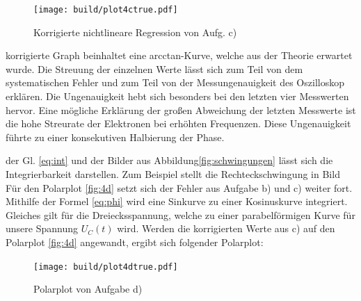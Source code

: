  \begin{figure}[H]
    \texttt{[image: build/plot4ctrue.pdf]}
    \centering
    \caption{Korrigierte nichtlineare Regression von Aufg. c)}
    \label{fig:4ctrue}
  \end{figure}

 \justifying korrigierte Graph beinhaltet eine arcctan-Kurve, welche aus der Theorie 
erwartet wurde. Die Streuung der einzelnen Werte lässt sich zum Teil von dem 
systematischen Fehler und zum Teil von der Messungenauigkeit des Oszilloskop erklären.
Die Ungenauigkeit hebt sich besonders bei den letzten vier Messwerten hervor. 
Eine mögliche Erklärung der großen Abweichung der letzten Messwerte ist die hohe 
Streurate der Elektronen bei erhöhten Frequenzen. Diese Ungenauigkeit führte zu einer 
konsekutiven Halbierung der Phase.


 \justifying der Gl. \eqref{eq:int} und der Bilder aus Abbildung\ref{fig:schwingungen} 
lässt sich die Integrierbarkeit darstellen. Zum Beispiel stellt die Rechteckschwingung in Bild \\
Für den Polarplot \ref{fig:4d} setzt sich der Fehler aus Aufgabe b) und c) weiter fort.
Mithilfe der Formel \eqref{eq:phi} wird eine Sinkurve zu einer Kosinuskurve integriert.
Gleiches gilt für die Dreiecksspannung, welche zu einer parabelförmigen
Kurve für unsere Spannung $U_C(t)$ wird.
Werden die korrigierten Werte aus c) auf den Polarplot \ref{fig:4d} angewandt, ergibt sich 
folgender Polarplot:

  \begin{figure}[H]
    \texttt{[image: build/plot4dtrue.pdf]}
    \centering
    \caption{Polarplot von Aufgabe d)}
    \label{fig:4dtrue}
  \end{figure}

\newpage
\nocite{V353}
\nocite{scipy}
\nocite{uncertainties}
\printbibliography
